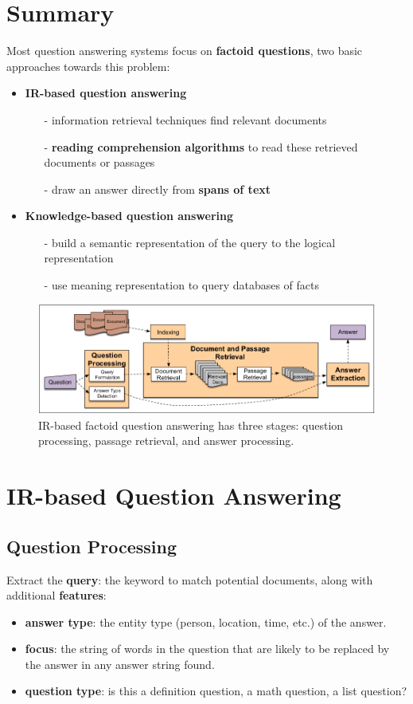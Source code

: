\documentclass[a3paper, 12pt]{book} %
\begin{document}
\section{Summary}
Most question answering systems focus on \textbf{factoid questions}, two basic approaches towards this problem:
\begin{itemize}
	\item \textbf{IR-based question answering}
	\begin{itemize}
		\item[-] information retrieval techniques find relevant documents
		\item[-] \textbf{reading comprehension algorithms} to read these retrieved documents or passages
		\item[-] draw an answer directly from \textbf{spans of text}
	\end{itemize}
	\item \textbf{Knowledge-based question answering}
	\begin{itemize}
		\item[-] build a semantic representation of the query to the logical representation
		\item[-] use meaning representation to query databases of facts
	\end{itemize}
\end{itemize}

\begin{figure}[htpb]
	\centering
	\includegraphics[width=\linewidth]{figures/ir_qa_overview.png}
	\caption{IR-based factoid question answering has three stages: question processing, passage retrieval, and
		answer processing.}
	\label{fig:boat1}
\end{figure}

\section{IR-based Question Answering}
\subsection{Question Processing}
Extract the \textbf{query}: the keyword to match potential documents, along with additional \textbf{features}:
\begin{itemize}
	\item \textbf{answer type}: the entity type (person, location, time, etc.) of the answer.
	\item \textbf{focus}: the string of words in the question that are likely to be replaced by the answer in any answer string found.
	\item \textbf{question type}: is this a definition question, a math question, a list question?
\end{itemize}
\end{document}
